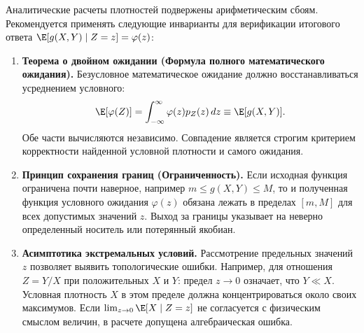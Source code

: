 Аналитические расчеты плотностей подвержены арифметическим сбоям. Рекомендуется применять следующие инварианты для верификации итогового ответа $\E[g(X,Y) \mid Z=z] = \varphi(z)$:

\begin{enumerate}[label=\textbf{\arabic*.}]
    \item \textbf{Теорема о двойном ожидании (Формула полного математического ожидания).} 
    Безусловное математическое ожидание должно восстанавливаться усреднением условного:
    \[
        \E[\varphi(Z)] = \int_{-\infty}^{\infty} \varphi(z) p_Z(z) \, dz \equiv \E[g(X,Y)].
    \]
    Обе части вычисляются независимо. Совпадение является строгим критерием корректности найденной условной плотности и самого ожидания.
    
    \item \textbf{Принцип сохранения границ (Ограниченность).}
    Если исходная функция ограничена почти наверное, например $m \le g(X,Y) \le M$, то и полученная функция условного ожидания $\varphi(z)$ обязана лежать в пределах $[m, M]$ для всех допустимых значений $z$. Выход за границы указывает на неверно определенный носитель или потерянный якобиан.
    
    \item \textbf{Асимптотика экстремальных условий.}
    Рассмотрение предельных значений $z$ позволяет выявить топологические ошибки. Например, для отношения $Z = Y/X$ при положительных $X$ и $Y$: предел $z \to 0$ означает, что $Y \ll X$. Условная плотность $X$ в этом пределе должна концентрироваться около своих максимумов. Если $\lim_{z \to 0} \E[X \mid Z=z]$ не согласуется с физическим смыслом величин, в расчете допущена алгебраическая ошибка.
\end{enumerate}
